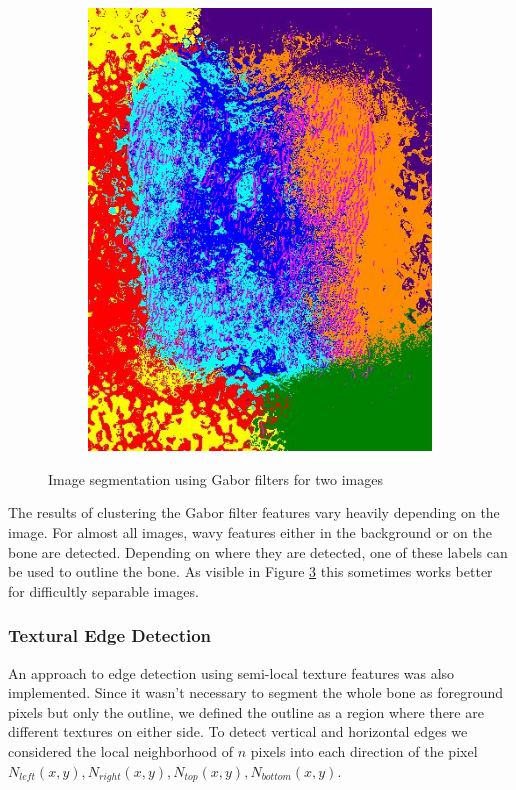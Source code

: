 \documentclass[pdftex,12pt,a4paper]{report}
\begin{document}
\begin{figure}[h]
\begin{subfigure}[b]{0.24\textwidth}
		\subcaption{}
		\label{fig:gabor:bad}
	\end{subfigure}
	\begin{subfigure}[b]{0.24\textwidth}
		\centering
		\includegraphics[width=.9\linewidth]{img/segmentation/bad/gabor/segmented.jpg}
		\subcaption*{}
		\label{}
	\end{subfigure}
	\caption{Image segmentation using Gabor filters for two images}
	\label{fig:gabor}
\end{figure}

The results of clustering the Gabor filter features vary heavily depending on the image. For almost all images, wavy features either in the background or on the bone are detected. Depending on where they are detected, one of these labels can be used to outline the bone. As visible in Figure \ref{fig:gabor} this sometimes works better for difficultly separable images.

\subsubsection{Textural Edge Detection}

An approach to edge detection using semi-local texture features was also implemented. Since it wasn't necessary to segment the whole bone as foreground pixels but only the outline, we defined the outline as a region where there are different textures on either side. To detect vertical and horizontal edges we considered the local neighborhood of $n$ pixels into each direction of the pixel $N_{left}(x,y), N_{right}(x,y), N_{top}(x,y), N_{bottom}(x,y)$.
\end{document}
